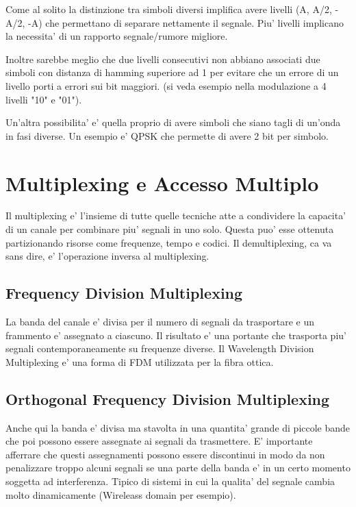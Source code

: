 Come al solito la distinzione tra simboli diversi implifica avere livelli (A, A/2, -A/2, -A) che permettano di separare nettamente il segnale.
Piu' livelli implicano la necessita' di un rapporto segnale/rumore migliore.

Inoltre sarebbe meglio che due livelli consecutivi non abbiano associati due simboli con distanza di hamming superiore ad 1 per evitare che un errore di un livello porti a errori sui bit maggiori. (si veda esempio nella modulazione a 4 livelli "10" e "01").


Un'altra possibilita' e' quella proprio di avere simboli che siano tagli di un'onda in fasi diverse. Un esempio e' QPSK che permette di avere 2 bit per simbolo.


\section{Multiplexing e Accesso Multiplo}

Il multiplexing e' l'insieme di tutte quelle tecniche atte a condividere la capacita' di un canale per combinare piu' segnali in uno solo. Questa puo' esse ottenuta partizionando risorse come frequenze, tempo e codici.
Il demultiplexing, ca va sans dire, e' l'operazione inversa al multiplexing.


\subsection{Frequency Division Multiplexing}

La banda del canale e' divisa per il numero di segnali da trasportare e un frammento e' assegnato a ciascuno. Il risultato e' una portante che trasporta piu' segnali contemporaneamente su frequenze diverse.
Il Wavelength Division Multiplexing e' una forma di FDM utilizzata per la fibra ottica.


\subsection{Orthogonal Frequency Division Multiplexing}

Anche qui la banda e' divisa ma stavolta in una quantita' grande di piccole bande che poi possono essere assegnate ai segnali da trasmettere.
E' importante afferrare che questi assegnamenti possono essere discontinui in modo da non penalizzare troppo alcuni segnali se una parte della banda e' in un certo momento soggetta ad interferenza.
Tipico di sistemi in cui la qualita' del segnale cambia molto dinamicamente (Wireleass domain per esempio).

